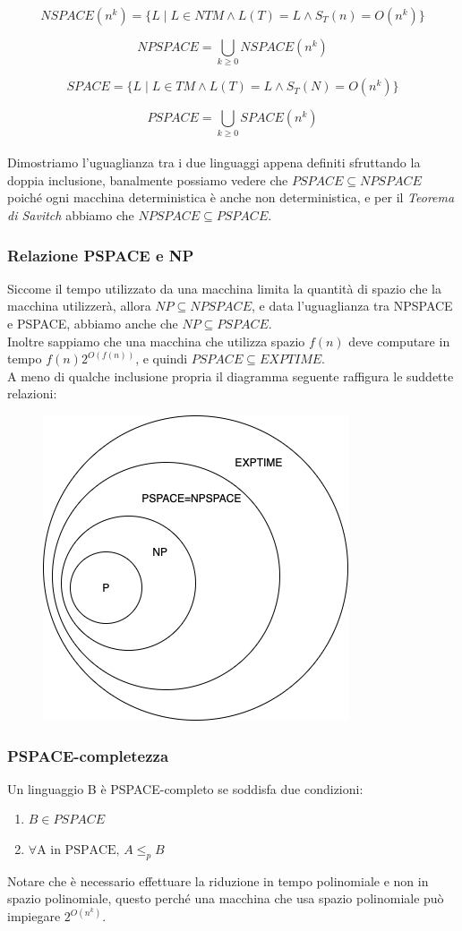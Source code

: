 $$NSPACE(n^k) = \{ L \mid L \in NTM \land L(T)=L \land S_T(n)=O(n^k) \}$$

$$NPSPACE = \bigcup_{k\geq 0} NSPACE(n^k)$$

$$SPACE = \{ L \mid L \in TM \land L(T)=L \land S_T(N)=O(n^k) \}$$

$$PSPACE = \bigcup_{k\geq 0} SPACE(n^k)$$
\\
Dimostriamo l'uguaglianza tra i due linguaggi appena definiti sfruttando la doppia inclusione, banalmente possiamo vedere che $PSPACE \subseteq NPSPACE$ poiché ogni macchina deterministica è anche non deterministica, e per il \emph{Teorema di Savitch} abbiamo che $NPSPACE \subseteq PSPACE$.
\subsubsection{Relazione PSPACE e NP}
Siccome il tempo utilizzato da una macchina limita la quantità di spazio che la macchina utilizzerà, allora $NP \subseteq NPSPACE$, e data l'uguaglianza tra NPSPACE e PSPACE, abbiamo anche che $NP \subseteq PSPACE$.
\\
Inoltre sappiamo che una macchina che utilizza spazio $f(n)$ deve computare in tempo $f(n)2^{O(f(n))}$, e quindi $PSPACE \subseteq EXPTIME$.
\\
A meno di qualche inclusione propria il diagramma seguente raffigura le suddette relazioni:
\begin{figure}[H]
    \centering
    \includegraphics[scale=0.6]{NP-PSPACE}
\end{figure}
\subsubsection{PSPACE-completezza}
Un linguaggio B è PSPACE-completo se soddisfa due condizioni:
\begin{enumerate}
	\item $B \in PSPACE$
	\item $\forall \text{A in PSPACE, }A \leq_{p} B$
\end{enumerate}
Notare che è necessario effettuare la riduzione in tempo polinomiale e non in spazio polinomiale, questo perché una macchina che usa spazio polinomiale può impiegare $2^{O(n^k)}$.
